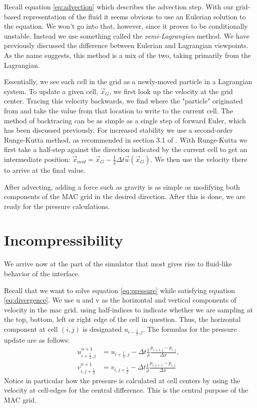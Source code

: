 Recall equation \vref{eq:advection} which describes the advection
step. With our grid-based representation of the fluid it seems obvious
to use an Eulerian solution to the equation. We won't go into that,
however, since it proves to be conditionally unstable. Instead we use
something called the \textit{semi-Lagrangian} method. We have
previously discussed the difference between Eulerian and Lagrangian
viewpoints. As the name suggests, this method is a mix of the two,
taking primarily from the Lagrangian.

Essentially, we see each cell in the grid as a newly-moved particle in
a Lagrangian system. To update a given cell, $\vec{x}_G$, we first
look up the velocity at the grid center. Tracing this velocity
backwards, we find where the "particle" originated from and take the
value from that location to write to the current cell. The method of
backtracing can be as simple as a single step of forward Euler, which
has been discussed previously. For increased stability we use a
second-order Runge-Kutta method, as recommended in section 3.1 of
. With Runge-Kutta we first take a half-step
against the direction indicated by the current cell to get an
intermediate position: $\vec{x}_{mid} = \vec{x}_G - \frac{1}{2}\Delta
t \vec{u}\left(\vec{x}_G\right)$. We then use the velocity there to
arrive at the final value.

After advecting, adding a force such as gravity is as simple as
modifying both components of the MAC grid in the desired
direction. After this is done, we are ready for the pressure
calculations.

\section{Incompressibility}
We arrive now at the part of the simulator that most gives rise to
fluid-like behavior of the interface.

Recall that we want to solve equation \vref{eq:pressure} while
satisfying equation \vref{eq:divergence}. We use u and v as the
horizontal and vertical components of velocity in the mac grid, using
half-indices to indicate whether we are sampling at the top, bottom,
left or right edge of the cell in question. Thus, the horizontal
component at cell $(i,j)$ is designated $u_{i-\frac{1}{2},j}$. The
formulas for the pressure update are as follows:
\begin{align}
u_{i+\frac{1}{2},j}^{n+1} &= u_{i+\frac{1}{2},j} - \Delta t\frac{1}{\rho}\frac{p_{i+1,j}-p_{i,j}}{\Delta x},\\
v_{i,j+\frac{1}{2}}^{n+1} &= v_{i,j+\frac{1}{2}} - \Delta t\frac{1}{\rho}\frac{p_{i,j+1}-p_{i,j}}{\Delta x}
\end{align}
Notice in particular how the pressure is calculated at cell centers by
using the velocity at cell-edges for the central difference. This is
the central purpose of the MAC grid.

